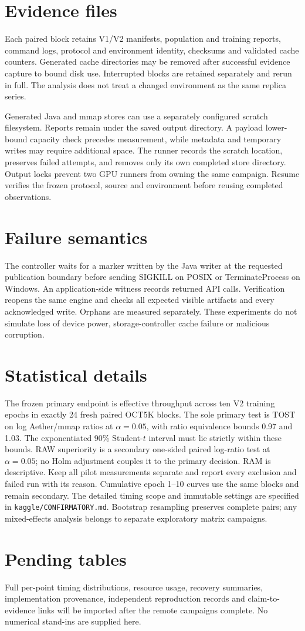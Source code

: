 \documentclass[11pt]{article}
\begin{document}
\section{Evidence files}
Each paired block retains V1/V2 manifests, population and training reports, command logs, protocol and environment identity, checksums and validated cache counters. Generated cache directories may be removed after successful evidence capture to bound disk use. Interrupted blocks are retained separately and rerun in full. The analysis does not treat a changed environment as the same replica series.

Generated Java and mmap stores can use a separately configured scratch filesystem. Reports remain under the saved output directory. A payload lower-bound capacity check precedes measurement, while metadata and temporary writes may require additional space. The runner records the scratch location, preserves failed attempts, and removes only its own completed store directory. Output locks prevent two GPU runners from owning the same campaign. Resume verifies the frozen protocol, source and environment before reusing completed observations.

\section{Failure semantics}
The controller waits for a marker written by the Java writer at the requested publication boundary before sending SIGKILL on POSIX or TerminateProcess on Windows. An application-side witness records returned API calls. Verification reopens the same engine and checks all expected visible artifacts and every acknowledged write. Orphans are measured separately. These experiments do not simulate loss of device power, storage-controller cache failure or malicious corruption.

\section{Statistical details}
The frozen primary endpoint is effective throughput across ten V2 training epochs in exactly 24 fresh paired OCT5K blocks. The sole primary test is TOST on log Aether/mmap ratios at $\alpha=0.05$, with ratio equivalence bounds 0.97 and 1.03. The exponentiated 90\% Student-$t$ interval must lie strictly within these bounds. RAW superiority is a secondary one-sided paired log-ratio test at $\alpha=0.05$; no Holm adjustment couples it to the primary decision. RAM is descriptive. Keep all pilot measurements separate and report every exclusion and failed run with its reason. Cumulative epoch 1--10 curves use the same blocks and remain secondary. The detailed timing scope and immutable settings are specified in \texttt{kaggle/CONFIRMATORY.md}. Bootstrap resampling preserves complete pairs; any mixed-effects analysis belongs to separate exploratory matrix campaigns.

\section{Pending tables}
Full per-point timing distributions, resource usage, recovery summaries, implementation provenance, independent reproduction records and claim-to-evidence links will be imported after the remote campaigns complete. No numerical stand-ins are supplied here.
\end{document}
